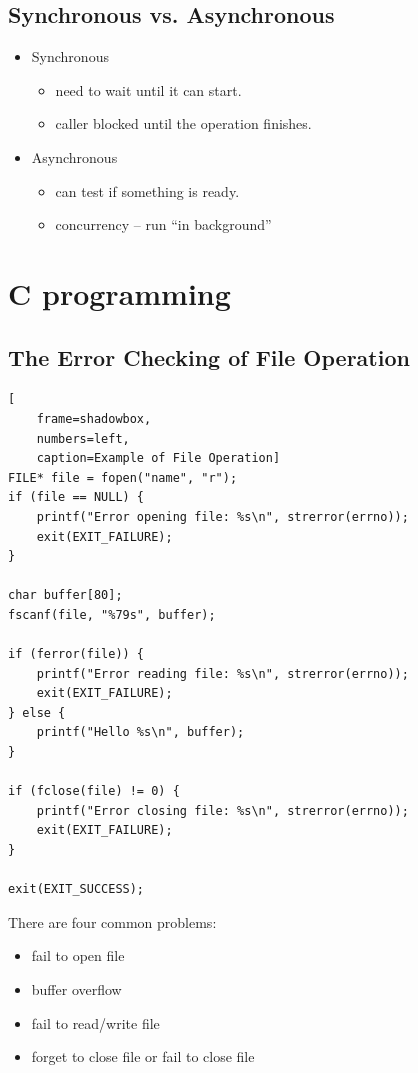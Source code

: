 \documentclass{article}
\begin{document}
\subsection{Synchronous vs. Asynchronous}

\begin{itemize}
    \item Synchronous
    \begin{itemize}
        \item need to wait until it can start.
        \item caller blocked until the operation finishes.
    \end{itemize}
    \item Asynchronous
    \begin{itemize}
        \item can test if something is ready.
        \item concurrency – run “in background”
    \end{itemize}
\end{itemize}



\section{C programming}

\subsection{The Error Checking of File Operation }

\begin{lstlisting}[
    frame=shadowbox,
    numbers=left,
    caption=Example of File Operation]
FILE* file = fopen("name", "r");
if (file == NULL) {
    printf("Error opening file: %s\n", strerror(errno));
    exit(EXIT_FAILURE);
}

char buffer[80];
fscanf(file, "%79s", buffer);

if (ferror(file)) {
    printf("Error reading file: %s\n", strerror(errno));
    exit(EXIT_FAILURE);
} else {
    printf("Hello %s\n", buffer);
}

if (fclose(file) != 0) {
    printf("Error closing file: %s\n", strerror(errno));
    exit(EXIT_FAILURE);
}

exit(EXIT_SUCCESS);
\end{lstlisting}

There are four common problems:
\begin{itemize}
    \item fail to open file
    \item buffer overflow
    \item fail to read/write file
    \item forget to close file or fail to close file
\end{itemize}
\end{document}
